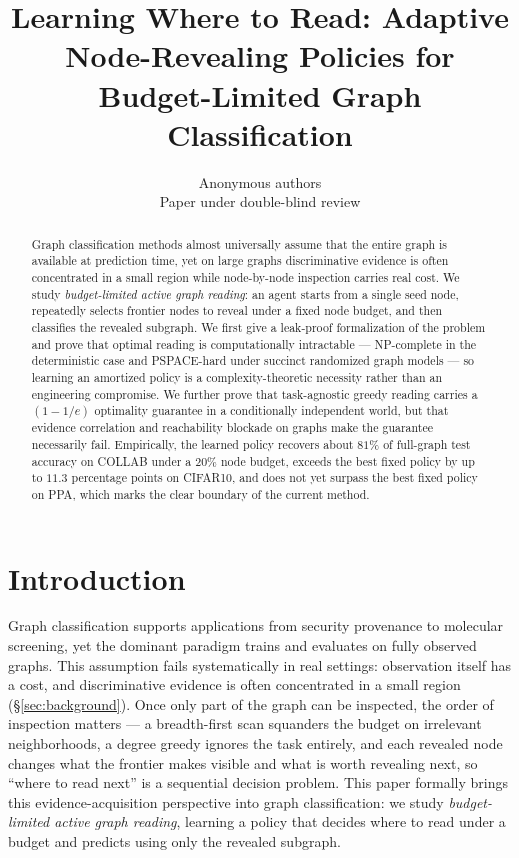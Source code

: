 \documentclass{article}
\title{Learning Where to Read: Adaptive Node-Revealing Policies for\\ Budget-Limited Graph Classification}
\author{Anonymous authors\\ Paper under double-blind review}
\begin{document}
\maketitle

\begin{abstract}
Graph classification methods almost universally assume that the entire graph is available at prediction time, yet on large graphs discriminative evidence is often concentrated in a small region while node-by-node inspection carries real cost. We study \emph{budget-limited active graph reading}: an agent starts from a single seed node, repeatedly selects frontier nodes to reveal under a fixed node budget, and then classifies the revealed subgraph. We first give a leak-proof formalization of the problem and prove that optimal reading is computationally intractable --- NP-complete in the deterministic case and PSPACE-hard under succinct randomized graph models --- so learning an amortized policy is a complexity-theoretic necessity rather than an engineering compromise. We further prove that task-agnostic greedy reading carries a $(1-1/e)$ optimality guarantee in a conditionally independent world, but that evidence correlation and reachability blockade on graphs make the guarantee necessarily fail. Empirically, the learned policy recovers about $81\%$ of full-graph test accuracy on COLLAB under a $20\%$ node budget, exceeds the best fixed policy by up to $11.3$ percentage points on CIFAR10, and does not yet surpass the best fixed policy on PPA, which marks the clear boundary of the current method.
\end{abstract}

\section{Introduction}
\label{sec:intro}

Graph classification supports applications from security provenance to molecular screening, yet the dominant paradigm trains and evaluates on fully observed graphs. This assumption fails systematically in real settings: observation itself has a cost, and discriminative evidence is often concentrated in a small region (\S\ref{sec:background}). Once only part of the graph can be inspected, the order of inspection matters --- a breadth-first scan squanders the budget on irrelevant neighborhoods, a degree greedy ignores the task entirely, and each revealed node changes what the frontier makes visible and what is worth revealing next, so ``where to read next'' is a sequential decision problem. This paper formally brings this evidence-acquisition perspective into graph classification: we study \emph{budget-limited active graph reading}, learning a policy that decides where to read under a budget and predicts using only the revealed subgraph.
\end{document}
